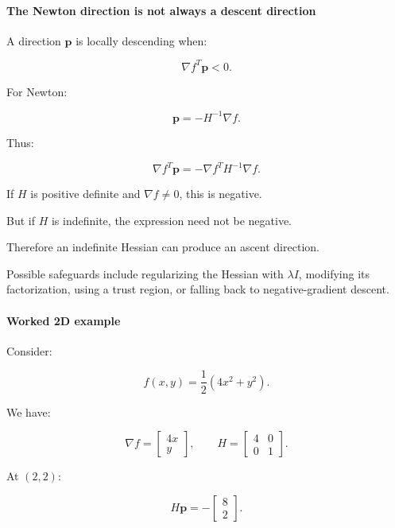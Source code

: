 \paragraph{The Newton direction is not always a descent direction}\label{02-foundations-ii-ch026-the-newton-direction-is-not-always-a-descent-direction}

\hypertarget{02-foundations-ii-ch026-the-newton-direction-is-not-always-a-descent-direction}{}

A direction \(\mathbf p\) is locally descending when:

\[
\nabla f^T\mathbf p<0.
\]

For Newton:

\[
\mathbf p=-H^{-1}\nabla f.
\]

Thus:

\[
\nabla f^T\mathbf p = -\nabla f^TH^{-1}\nabla f.
\]

If \(H\) is positive definite and \(\nabla f\ne0\), this is negative.

But if \(H\) is indefinite, the expression need not be negative.

Therefore an indefinite Hessian can produce an ascent direction.

Possible safeguards include regularizing the Hessian with \(\lambda I\), modifying its factorization, using a trust region, or falling back to negative-gradient descent.

\paragraph{Worked 2D example}\label{02-foundations-ii-ch026-worked-2d-example}

\hypertarget{02-foundations-ii-ch026-worked-2d-example}{}

Consider:

\[
f(x,y)=\frac12(4x^2+y^2).
\]

We have:

\[
\nabla f= \begin{bmatrix} 4x\\y \end{bmatrix}, \qquad H= \begin{bmatrix} 4&0\\0&1 \end{bmatrix}.
\]

At \((2,2)\):

\[
H\mathbf p= - \begin{bmatrix}8\\2\end{bmatrix}.
\]

